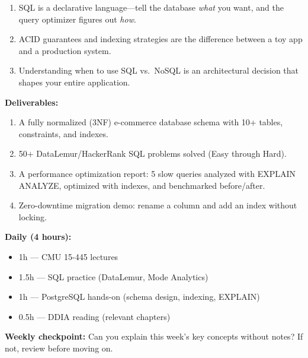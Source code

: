\documentclass[11pt, a4paper, oneside]{report}
\begin{document}
\begin{takeawaybox}
\begin{enumerate}[leftmargin=*]
\item SQL is a declarative language---tell the database \emph{what} you want, and the query optimizer figures out \emph{how}.
\item ACID guarantees and indexing strategies are the difference between a toy app and a production system.
\item Understanding when to use SQL vs.\ NoSQL is an architectural decision that shapes your entire application.
\end{enumerate}
\end{takeawaybox}

\begin{milestonebox}
\textbf{Deliverables:}
\begin{enumerate}[leftmargin=*]
\item A fully normalized (3NF) e-commerce database schema with 10+ tables, constraints, and indexes.
\item 50+ DataLemur/HackerRank SQL problems solved (Easy through Hard).
\item A performance optimization report: 5 slow queries analyzed with EXPLAIN ANALYZE, optimized with indexes, and benchmarked before/after.
\item Zero-downtime migration demo: rename a column and add an index without locking.
\end{enumerate}
\end{milestonebox}

\begin{practicebox}
\textbf{Daily (4 hours):}
\begin{itemize}[leftmargin=*]
\item 1h --- CMU 15-445 lectures
\item 1.5h --- SQL practice (DataLemur, Mode Analytics)
\item 1h --- PostgreSQL hands-on (schema design, indexing, EXPLAIN)
\item 0.5h --- DDIA reading (relevant chapters)
\end{itemize}


\textbf{Weekly checkpoint:} Can you explain this week's key concepts without notes? If not, review before moving on.
\end{practicebox}

\clearpage
\end{document}
